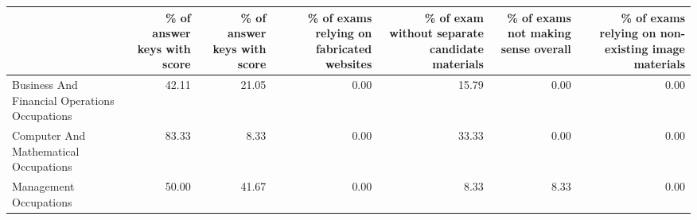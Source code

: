 \begin{tabular}{lrrrrrr}
\toprule
 & \% of answer keys with score \< 99 & \% of answer keys with score \> 100 & \% of exams relying on fabricated websites & \% of exam without separate candidate materials & \% of exams not making sense overall & \% of exams relying on non-existing image materials \\
\midrule
Business And Financial Operations Occupations & 42.11 & 21.05 & 0.00 & 15.79 & 0.00 & 0.00 \\
Computer And Mathematical Occupations & 83.33 & 8.33 & 0.00 & 33.33 & 0.00 & 0.00 \\
Management Occupations & 50.00 & 41.67 & 0.00 & 8.33 & 8.33 & 0.00 \\
\bottomrule
\end{tabular}
